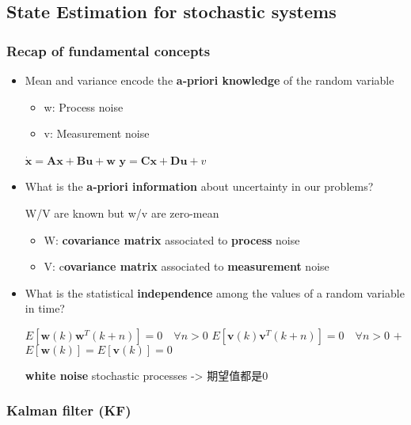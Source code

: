 \documentclass[]{article}
\begin{document}
\subsection{State Estimation for stochastic systems}\label{header-n892}

\subsubsection{Recap of fundamental concepts}\label{header-n893}

\begin{itemize}
\item
  Mean and variance encode the \textbf{a‐priori knowledge} of the random
  variable

  \begin{itemize}
  \item
    w: Process noise
  \item
    v: Measurement noise
  \end{itemize}

  \(\dot{\boldsymbol{x}}=\boldsymbol{A} \boldsymbol{x}+\boldsymbol{B} \boldsymbol{u}+\boldsymbol{w}\)
  \(\boldsymbol{y}=\boldsymbol{C} \boldsymbol{x}+\boldsymbol{D} \boldsymbol{u}+v\)
\item
  What is the \textbf{a‐priori information} about uncertainty in our
  problems?

  W/V are known but w/v are zero-mean

  \begin{itemize}
  \item
    W: \textbf{covariance matrix} associated to \textbf{process} noise
  \item
    V: c\textbf{ovariance matrix} associated to \textbf{measurement}
    noise
  \end{itemize}
\item
  What is the statistical \textbf{independence} among the values of a
  random variable in time?

  \(E\left[\boldsymbol{w}(k) \boldsymbol{w}^{T}(k+n)\right]=0 \quad \forall n>0\)
  \(E\left[\boldsymbol{v}(k) \boldsymbol{v}^{T}(k+n)\right]=0 \quad \forall n>0\)
  \(+\) \(E[\boldsymbol{w}(k)]=E[\boldsymbol{v}(k)]=0\)

  \textbf{white noise} stochastic processes -\textgreater{} 期望值都是0
\end{itemize}

\subsubsection{Kalman filter (KF)}\label{header-n915}
\end{document}
